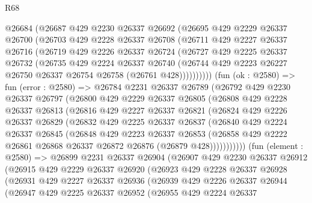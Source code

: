 \begin{lexlean}{R68}
\begin{coremodule}
      @26684
      (@26687
        @429
        @2230
        @26337
        @26692
        (@26695
          @429
          @2229
          @26337
          @26700
          (@26703
            @429
            @2228
            @26337
            @26708
            (@26711
              @429
              @2227
              @26337
              @26716
              (@26719
                @429
                @2226
                @26337
                @26724
                (@26727
                  @429
                  @2225
                  @26337
                  @26732
                  (@26735
                    @429
                    @2224
                    @26337
                    @26740
                    (@26744 @429 @2223 @26227 @26750 @26337 @26754 @26758 (@26761 @428))))))))))
    (fun (ok : @2580) =>
    fun (error : @2580) =>
    @26784
      @2231
      @26337
      @26789
      (@26792
        @429
        @2230
        @26337
        @26797
        (@26800
          @429
          @2229
          @26337
          @26805
          (@26808
            @429
            @2228
            @26337
            @26813
            (@26816
              @429
              @2227
              @26337
              @26821
              (@26824
                @429
                @2226
                @26337
                @26829
                (@26832
                  @429
                  @2225
                  @26337
                  @26837
                  (@26840
                    @429
                    @2224
                    @26337
                    @26845
                    (@26848
                      @429
                      @2223
                      @26337
                      @26853
                      (@26858 @429 @2222 @26861 @26868 @26337 @26872 @26876 (@26879 @428)))))))))))
    (fun (element : @2580) =>
    @26899
      @2231
      @26337
      @26904
      (@26907
        @429
        @2230
        @26337
        @26912
        (@26915
          @429
          @2229
          @26337
          @26920
          (@26923
            @429
            @2228
            @26337
            @26928
            (@26931
              @429
              @2227
              @26337
              @26936
              (@26939
                @429
                @2226
                @26337
                @26944
                (@26947
                  @429
                  @2225
                  @26337
                  @26952
                  (@26955
                    @429
                    @2224
                    @26337

\end{coremodule}
\end{lexlean}
